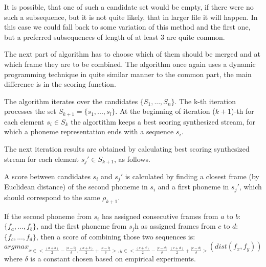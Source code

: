 \documentclass[12pt,a4paper,english]{article}
\begin{document}
It is possible, that one of such a candidate set would be empty, if there were no such a subsequence, but it is not quite likely, that in larger file it will happen. In this case we could fall back to some variation of this method and the first one, but a preferred subsequences of length of at least 3 are quite common.\newline

The next part of algorithm has to choose which of them should be merged and at which frame they are to be combined. \newline
The algorithm once again uses a dynamic programming technique in quite similar manner to the common part, the main difference is in the scoring function.

\newpage

The algorithm iterates over the candidates $\{S_1, ..., S_n\}$. \newline
The k-th iteration processes the set $S_{k+1} = \{s_1, ..., s_l\}$. \newline
At the beginning of iteration ($k+1$)-th for each element $s_i \in S_k$ the algortithm keeps a best scoring synthesized stream, for which a phoneme representation ends with a sequence $s_i$. \newline

The next iteration results are obtained by calculating best scoring synthesized stream for each element $s_j' \in S_{k+1}$, as follows. \newline

A score between candidates $s_i$ and $s_j'$ is calculated by finding a closest frame (by Euclidean distance) of the second phoneme in $s_i$ and a first phoneme in $s_j'$, which should correspond to the same $\rho_{k+1}$. \newline

If the second phoneme from $s_i$ has assigned consecutive frames from $a$ to $b$: $\{f_a, ..., f_b\}$, \newline
and the first phoneme from $s_j$h as assigned frames from $c$ to $d$: $\{f_c, ..., f_d\}$, \newline
then a score of combining those two sequences is:
\begin{equation}
    argmax_{x \in <\frac {(a + b)} 2 - \frac {|a - b|} \delta, \frac {(a + b)} 2 + \frac {|a - b|} \delta>, y \in <\frac {(c + d)} 2 - \frac {|c - d|} \delta, \frac {(c + d)} 2 + \frac {|c - d|} \delta>}(dist(f_x, f_y))
\end{equation}
where $\delta$ is a constant chosen based on empirical experiments. \newline
\end{document}
